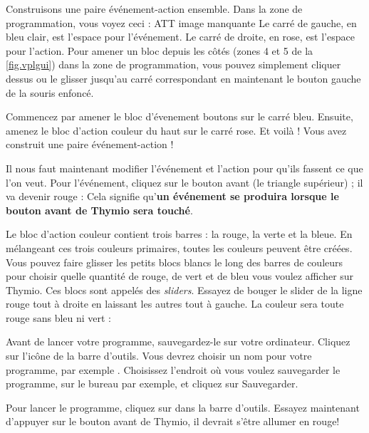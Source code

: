 
Construisons une paire événement-action ensemble.
Dans la zone de programmation, vous voyez ceci : ATT image manquante%
Le carré de gauche, en bleu clair, est l'espace pour l'événement.
Le carré de droite, en rose, est l'espace pour l'action.
Pour amener un bloc depuis les côtés (zones 4 et 5 de la \cref{fig.vplgui}) dans la zone de programmation, vous pouvez simplement cliquer dessus ou le glisser jusqu'au carré correspondant en maintenant le bouton gauche de la souris enfoncé.

Commencez par amener le bloc d'évenement boutons  sur le carré bleu.
Ensuite, amenez le bloc d'action couleur du haut  sur le carré rose.
Et voilà ! Vous avez construit une paire événement-action !

Il nous faut maintenant modifier l'événement et l'action pour qu'ils fassent ce que l'on veut.
Pour l'événement, cliquez sur le bouton avant (le triangle supérieur) ; il va devenir rouge : 
Cela signifie qu'\textbf{un événement se produira lorsque le bouton avant de Thymio sera touché}.

Le bloc d'action couleur contient trois barres : la rouge, la verte et la bleue. En mélangeant ces trois couleurs primaires, toutes les couleurs peuvent être créées. Vous pouvez faire glisser les petits blocs blancs le long des barres de couleurs pour choisir quelle quantité de rouge, de vert et de bleu vous voulez afficher sur Thymio. Ces blocs sont appelés des \emph{sliders}. Essayez de bouger le slider de la ligne rouge tout à droite en laissant les autres tout à gauche.
La couleur sera toute rouge sans bleu ni vert : 


Avant de lancer votre programme, sauvegardez-le sur votre ordinateur.
Cliquez sur l'icône  de la barre d'outils.
Vous devrez choisir un nom pour votre programme, par exemple .
Choisissez l'endroit où vous voulez sauvegarder le programme, sur le bureau par exemple, et cliquez sur Sauvegarder.


Pour lancer le programme, cliquez sur  dans la barre d'outils.
Essayez maintenant d'appuyer sur le bouton avant de Thymio, il devrait s'être allumer en rouge!

